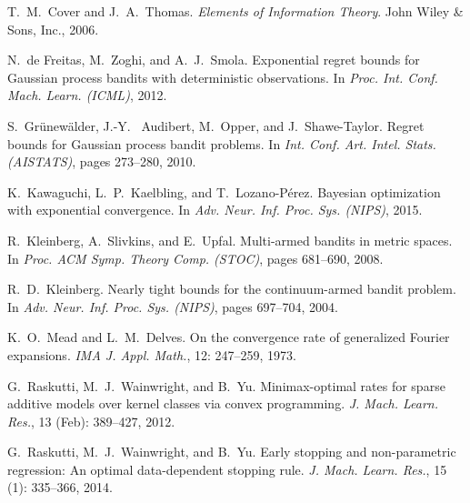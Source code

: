 \documentclass[english,onecolumn,final,11pt]{IEEEtran} %
\begin{document}
\begin{thebibliography}{23}
T.~M.~Cover and J.~A.~Thomas.
\newblock \emph{Elements of Information Theory}.
\newblock John Wiley \& Sons, Inc., 2006.

N.~{de Freitas}, M.~Zoghi, and A.~J.~Smola.
\newblock Exponential regret bounds for {G}aussian process bandits with
  deterministic observations.
\newblock In \emph{Proc. Int. Conf. Mach. Learn. (ICML)}, 2012.

S.~Gr{\"u}new{\"a}lder, J.-Y.~ Audibert, M.~Opper, and J.~Shawe-Taylor.
\newblock Regret bounds for {G}aussian process bandit problems.
\newblock In \emph{Int. Conf. Art. Intel. Stats. (AISTATS)}, pages 273--280, 2010.

K.~Kawaguchi, L.~P.~Kaelbling, and T.~Lozano-P{\'e}rez.
\newblock Bayesian optimization with exponential convergence.
\newblock In \emph{Adv. Neur. Inf. Proc. Sys. (NIPS)}, 2015.

R.~Kleinberg, A.~Slivkins, and E.~Upfal.
\newblock Multi-armed bandits in metric spaces.
\newblock In \emph{Proc. ACM Symp. Theory Comp. (STOC)}, pages 681--690,
  2008.

R.~D.~Kleinberg.
\newblock Nearly tight bounds for the continuum-armed bandit problem.
\newblock In \emph{Adv. Neur. Inf. Proc. Sys. (NIPS)}, pages 697--704, 2004.

K.~O.~Mead and L.~M.~Delves.
\newblock On the convergence rate of generalized {F}ourier expansions.
\newblock \emph{IMA J. Appl. Math.}, 12: 247--259, 1973.

G.~Raskutti, M.~J.~Wainwright, and B.~Yu.
\newblock Minimax-optimal rates for sparse additive models over kernel classes
  via convex programming.
\newblock \emph{J. Mach. Learn. Res.}, 13 (Feb): 389--427,
  2012.

G.~Raskutti, M.~J.~Wainwright, and B.~Yu.
\newblock Early stopping and non-parametric regression: An optimal
  data-dependent stopping rule.
\newblock \emph{J. Mach. Learn. Res.}, 15 (1): 335--366,
  2014.


\end{thebibliography}
\end{document}
